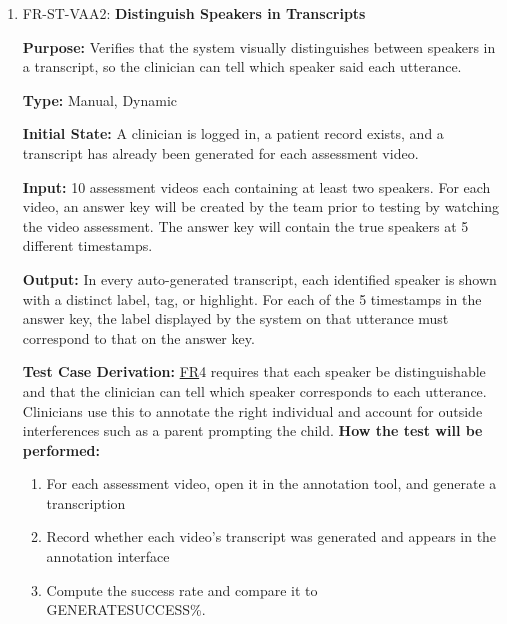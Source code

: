 \documentclass[12pt, titlepage]{article}
\newcommand{\srsfr}[1]{\href{https://github.com/Nour-Fawaz/MacaBoca/blob/main/pdfs/SRS/SRS.pdf}{FR}}
\renewcommand{\_}{\oldunderscore\allowbreak}
\begin{document}
\begin{enumerate}
  \item FR-ST-VAA2: \textbf{Distinguish Speakers in Transcripts\\}
  \begin{mdframed}[linewidth=0.5mm]
      \textbf{Purpose:} Verifies that the system visually distinguishes between speakers in a transcript, so the clinician can tell which speaker said each utterance. \par
      \textbf{Type:} Manual, Dynamic \par
      \textbf{Initial State:} A clinician is logged in, a patient record exists, and a transcript has already been generated for each assessment video. \par
      \textbf{Input:} 10 assessment videos each containing at least two speakers. For each video, an answer key will be created by the team prior to testing by watching the video assessment. The answer key will contain the true speakers at 5 different timestamps. \par
      \textbf{Output:} In every auto-generated transcript, each identified speaker is shown with a distinct label, tag, or highlight. For each of the 5 timestamps in the answer key, the label displayed by the system on that utterance must correspond to that on the answer key. \par
      \textbf{Test Case Derivation:} \srsfr*{4} requires that each speaker be distinguishable and that the clinician can tell which speaker corresponds to each utterance. Clinicians use this to annotate the right individual and account for outside interferences such as a parent prompting the child.
      \textbf{How the test will be performed:}
      \begin{enumerate}
          \item[1.] For each assessment video, open it in the annotation tool, and generate a transcription
          \item[2.] Record whether each video's transcript was generated and appears in the annotation interface
          \item[3.] Compute the success rate and compare it to \\ GENERATE\_SUCCESS\%.
      \end{enumerate}
  \end{mdframed}


\end{enumerate}
\end{document}
